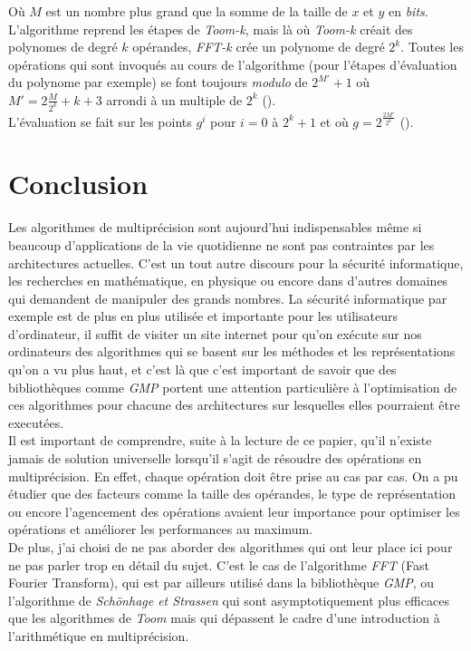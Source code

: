 \documentclass[letterpaper]{article}
\begin{document}
Où $M$ est un nombre plus grand que la somme de la taille de $x$ et $y$ en
\emph{bits}. L'algorithme reprend les étapes de \emph{Toom-k}, mais là où
\emph{Toom-k} créait des polynomes de degré $k$ opérandes, \emph{FFT-k} crée
un polynome de degré $2^{k}$. Toutes les opérations qui sont invoqués au cours
de l'algorithme (pour l'étapes d'évaluation du polynome par exemple) se font
toujours \emph{modulo} de $2^{M'} + 1$ où $M' = 2\frac{M}{2^{k}}+k+3$ arrondi à
un multiple de $2^k$ (\cite{gmplibfft}).\\

L'évaluation se fait sur les points $g^i$ pour $i = 0$ à $2^{k}+1$ et où
$g = 2^{\frac{2M'}{2^k}}$ (\cite{gmplibfft}).

\section{Conclusion}

Les algorithmes de multiprécision sont aujourd'hui indispensables même si
beaucoup d'applications de la vie quotidienne ne sont pas contraintes par les
architectures actuelles. C'est un tout autre discours pour la sécurité
informatique, les recherches en mathématique, en physique ou encore dans
d'autres domaines qui demandent de manipuler des grands nombres. La sécurité
informatique par exemple est de plus en plus utilisée et importante pour
les utilisateurs d'ordinateur, il suffit de visiter un site internet pour
qu'on exécute sur nos ordinateurs des algorithmes qui se basent sur les
méthodes et les représentations qu'on a vu plus haut, et c'est là que c'est
important de savoir que des bibliothèques comme \emph{GMP} portent une attention
particulière à l'optimisation de ces algorithmes pour chacune des architectures
sur lesquelles elles pourraient être executées.\\

Il est important de comprendre, suite à la lecture de ce papier, qu'il n'existe
jamais de solution universelle lorsqu'il s'agit de résoudre des opérations en
multiprécision. En effet, chaque opération doit être prise au cas par
cas. On a pu étudier que des facteurs comme la taille des opérandes, le type de
représentation ou encore l'agencement des opérations avaient leur importance
pour optimiser les opérations et améliorer les performances au maximum.\\

De plus, j'ai choisi de ne pas aborder des algorithmes qui ont leur place
ici pour ne pas parler trop en détail du sujet. C'est le cas de l'algorithme
\emph{FFT} (Fast Fourier Transform), qui est par ailleurs utilisé dans
la bibliothèque \emph{GMP}, ou l'algorithme de \emph{Schönhage et Strassen} qui
sont asymptotiquement plus efficaces que les algorithmes de \emph{Toom} mais
qui dépassent le cadre d'une introduction à l'arithmétique en multiprécision.\\
\end{document}
